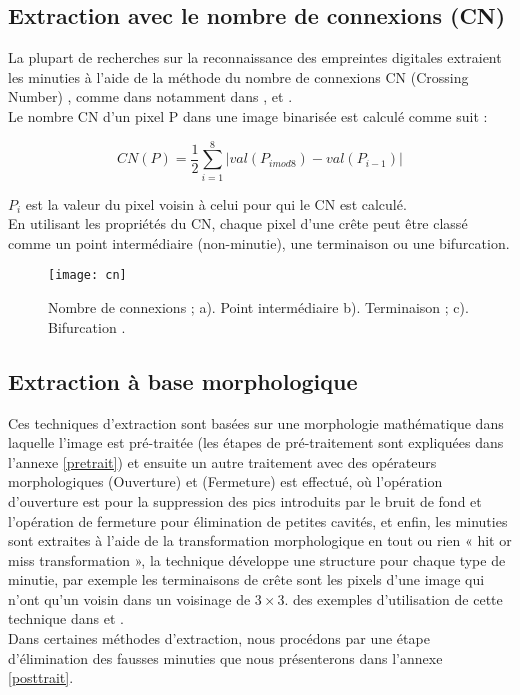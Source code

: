  \subsection{Extraction avec le nombre de connexions (CN)}
  La plupart de recherches sur la reconnaissance des empreintes digitales extraient les minuties à l'aide de la méthode du nombre de connexions CN (Crossing Number) , comme dans \citep{Thai2003} notamment dans \citep{amengual1997real} , \citep{mehtre1993fingerprint} et \citep{kasaei1997fingerprint}.
\\
Le nombre CN d'un pixel P dans une image binarisée est calculé comme suit \citep{maltoni2009handbook} :
\begin{center}
	\begin{equation}\label{eq:cn}
	CN (P) = \frac{1}{2}\sum_{i=1}^{8}|val (P_{i mod 8 } )-  val(P_{i-1}) |
	\end{equation}
\end{center}
$ P_{i} $ est la valeur du pixel voisin à celui pour qui le CN est calculé.
\\En utilisant les propriétés du CN, chaque pixel d'une crête peut être classé comme un point intermédiaire (non-minutie), une terminaison ou une bifurcation.

\begin{center}
	\begin{figure}[H]
		\centering
		\texttt{[image: cn]}
		\caption{Nombre de connexions ; a). Point intermédiaire b). Terminaison ; c). Bifurcation \citep{maltoni2009handbook}.}
		\label{fig:chapitre2cn}
	\end{figure}
\end{center}

\subsection{Extraction à base morphologique}
Ces techniques d'extraction sont basées sur une morphologie mathématique dans laquelle l'image est pré-traitée (les étapes de pré-traitement sont expliquées dans l'annexe \ref{pretrait}) et ensuite un autre traitement avec des opérateurs morphologiques (Ouverture) et (Fermeture) est effectué, où l'opération d'ouverture est pour la suppression des pics introduits par le bruit de fond et l'opération de fermeture pour élimination de petites cavités, et enfin, les minuties sont extraites à l'aide de la transformation morphologique en tout ou rien « hit or miss transformation », la technique développe une structure pour chaque type de minutie, par exemple les terminaisons de crête sont les pixels d'une image qui n'ont qu'un voisin dans un voisinage de $ 3 \times 3 $. des exemples d'utilisation de cette technique dans \citep{humbe2007mathematical} et \citep{bansal2010effective}.
\\ Dans certaines méthodes d'extraction, nous procédons par une étape d'élimination des fausses minuties que nous présenterons dans l'annexe \ref{posttrait}.
